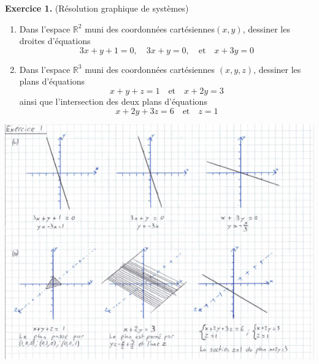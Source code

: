 \documentclass[a4paper, 10pt]{report}
\begin{document}
		
	\renewcommand{\headrule}{
	\color{lightgray} \par\noindent\rule{\textwidth}{2pt}
	}	
	\pagestyle{fancy}
	\fancyhf{}
	
	
	\noindent
	\textbf{Exercice 1.} (Résolution graphique de systèmes)
	
	\begin{enumerate}[label=(\alph*)]
		\item Dans l'espace $\mathbb{R}^2$ muni des
		coordonnées cartésiennes$(x, y)$, dessiner
		les droites d'équations
		\[
			3x + y + 1 = 0, \quad
			3x + y = 0, \quad
			\text{et} \quad
			x + 3y = 0
		\]
	
		\item Dans l'espace $\mathbb{R}^3$ muni des
		coordonnées cartésiennes $(x, y, z)$,
		dessiner les plans d'équations
		\[
		x + y + z = 1 \quad
		\text{et} \quad
		x + 2y = 3
		\]
		ainsi que l'intersection des deux plans d'équations
		\[
		x + 2y + 3z = 6 \quad
		\text{et} \quad
		z = 1
		\]
	\end{enumerate}

	\includegraphics{ex01.png}
	
	\newpage
	
\end{document}
